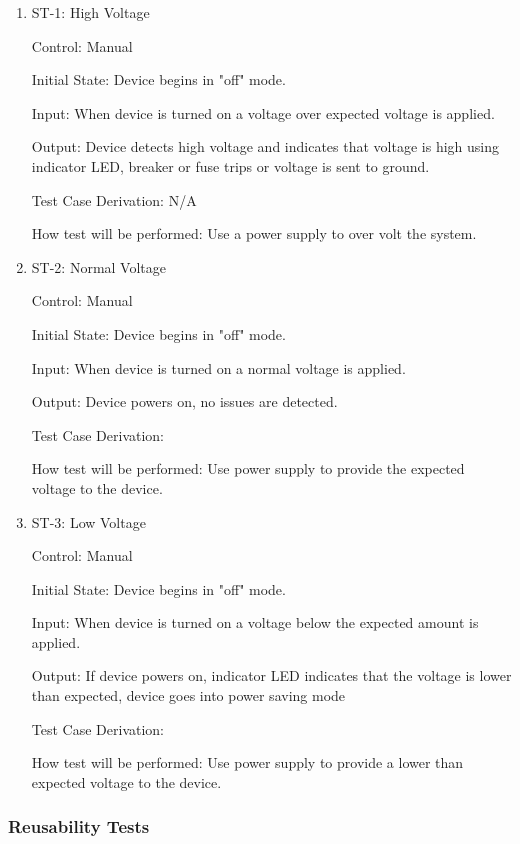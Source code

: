 \documentclass[12pt, titlepage]{article}
\begin{document}
\begin{enumerate}

\item{ST-1: High Voltage\\}

Control: Manual 

Initial State: Device begins in "off" mode.

Input: When device is turned on a voltage over expected voltage is applied.

Output: Device detects high voltage and indicates that voltage is high using indicator LED, breaker or fuse trips or voltage is sent to ground.

Test Case Derivation: N/A

How test will be performed: Use a power supply to over volt the system. 

\item{ST-2: Normal Voltage\\}

Control: Manual

Initial State: Device begins in "off" mode.

Input: When device is turned on a normal voltage is applied.

Output: Device powers on, no issues are detected.

Test Case Derivation:

How test will be performed: Use power supply to provide the expected voltage to the device.

\item{ST-3: Low Voltage\\}

Control: Manual

Initial State: Device begins in "off" mode.

Input: When device is turned on a voltage below the expected amount is applied.

Output: If device powers on, indicator LED indicates that the voltage is lower than expected, device goes into power saving mode

Test Case Derivation:

How test will be performed: Use power supply to provide a lower than expected voltage to the device.


\end{enumerate}

\subsubsection{Reusability Tests}
\end{document}
